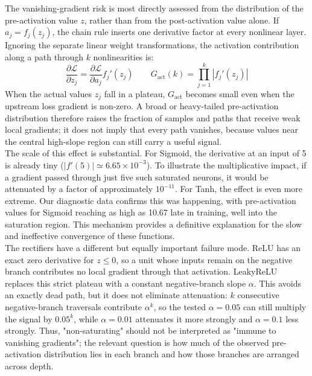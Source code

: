 The vanishing-gradient risk is most directly assessed from the distribution of the pre-activation value $z$, rather than from the post-activation value alone. If $a_j=f_j(z_j)$, the chain rule inserts one derivative factor at every nonlinear layer. Ignoring the separate linear weight transformations, the activation contribution along a path through $k$ nonlinearities is:
\begin{equation}
    \frac{\partial\mathcal{L}}{\partial z_j}
    =\frac{\partial\mathcal{L}}{\partial a_j}f_j'(z_j)
    \qquad
    G_{\mathrm{act}}(k)=\prod_{j=1}^{k}\left|f_j'(z_j)\right|
    \label{eq:04_activation_chain_gradient}
\end{equation}
When the actual values $z_j$ fall in a plateau, $G_{\mathrm{act}}$ becomes small even when the upstream loss gradient is non-zero. A broad or heavy-tailed pre-activation distribution therefore raises the fraction of samples and paths that receive weak local gradients; it does not imply that every path vanishes, because values near the central high-slope region can still carry a useful signal.\\

The scale of this effect is substantial. For Sigmoid, the derivative at an input of 5 is already tiny ($|f'(5)|\simeq6.65\times10^{-3}$). To illustrate the multiplicative impact, if a gradient passed through just five such saturated neurons, it would be attenuated by a factor of approximately $10^{-11}$. For Tanh, the effect is even more extreme. Our diagnostic data confirms this was happening, with pre-activation values for Sigmoid reaching as high as 10.67 late in training, well into the saturation region. This mechanism provides a definitive explanation for the slow and ineffective convergence of these functions.\\

The rectifiers have a different but equally important failure mode. ReLU has an exact zero derivative for $z\leq0$, so a unit whose inputs remain on the negative branch contributes no local gradient through that activation. LeakyReLU replaces this strict plateau with a constant negative-branch slope $\alpha$. This avoids an exactly dead path, but it does not eliminate attenuation: $k$ consecutive negative-branch traversals contribute $\alpha^k$, so the tested $\alpha=0.05$ can still multiply the signal by $0.05^k$, while $\alpha=0.01$ attenuates it more strongly and $\alpha=0.1$ less strongly. Thus, "non-saturating" should not be interpreted as "immune to vanishing gradients"; the relevant question is how much of the observed pre-activation distribution lies in each branch and how those branches are arranged across depth.\\

